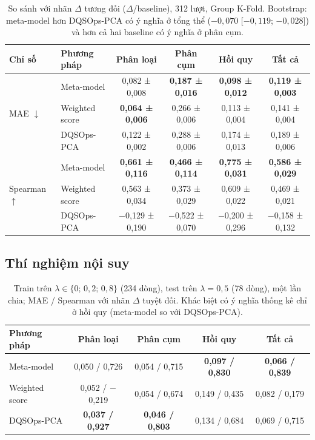 \begin{table}[ht]
\centering
\small
\begin{tabular}{@{}llcccc@{}}
\toprule
Chỉ số & Phương pháp & Phân loại & Phân cụm & Hồi quy & Tất cả \\
\midrule
\multirow{3}{*}{MAE $\downarrow$}
 & Meta-model     & 0,082 ± 0,008 & \textbf{0,187 ± 0,016} & \textbf{0,098 ± 0,012} & \textbf{0,119 ± 0,003} \\
 & Weighted score & \textbf{0,064 ± 0,006} & 0,266 ± 0,006 & 0,113 ± 0,004 & 0,141 ± 0,004 \\
 & DQSOps-PCA     & 0,122 ± 0,002 & 0,288 ± 0,006 & 0,174 ± 0,013 & 0,189 ± 0,006 \\
\midrule
\multirow{3}{*}{Spearman $\uparrow$}
 & Meta-model     & \textbf{0,661 ± 0,116} & \textbf{0,466 ± 0,114} & \textbf{0,775 ± 0,031} & \textbf{0,586 ± 0,029} \\
 & Weighted score & 0,563 ± 0,034 & 0,373 ± 0,029 & 0,609 ± 0,022 & 0,469 ± 0,021 \\
 & DQSOps-PCA     & $-$0,129 ± 0,190 & $-$0,522 ± 0,070 & $-$0,200 ± 0,296 & $-$0,158 ± 0,132 \\
\bottomrule
\end{tabular}
\caption{So sánh với nhãn $\Delta$ tương đối ($\Delta$/baseline), 312 lượt, Group K-Fold. Bootstrap: meta-model hơn DQSOps-PCA có ý nghĩa ở tổng thể ($-0{,}070$ [$-0{,}119$; $-0{,}028$]) và hơn cả hai baseline có ý nghĩa ở phân cụm.}
\end{table}

\subsection{Thí nghiệm nội suy}

\begin{table}[ht]
\centering
\small
\begin{tabular}{@{}lcccc@{}}
\toprule
Phương pháp & Phân loại & Phân cụm & Hồi quy & Tất cả \\
\midrule
Meta-model     & 0,050 / 0,726 & 0,054 / 0,715 & \textbf{0,097 / 0,830} & \textbf{0,066 / 0,839} \\
Weighted score & 0,052 / $-$0,219 & 0,054 / 0,674 & 0,149 / 0,435 & 0,082 / 0,179 \\
DQSOps-PCA     & \textbf{0,037 / 0,927} & \textbf{0,046 / 0,803} & 0,134 / 0,684 & 0,069 / 0,715 \\
\bottomrule
\end{tabular}
\caption{Train trên $\lambda \in \{0;\,0{,}2;\,0{,}8\}$ (234 dòng), test trên $\lambda = 0{,}5$ (78 dòng), một lần chia; MAE / Spearman với nhãn $\Delta$ tuyệt đối. Khác biệt có ý nghĩa thống kê chỉ ở hồi quy (meta-model so với DQSOps-PCA).}
\end{table}

